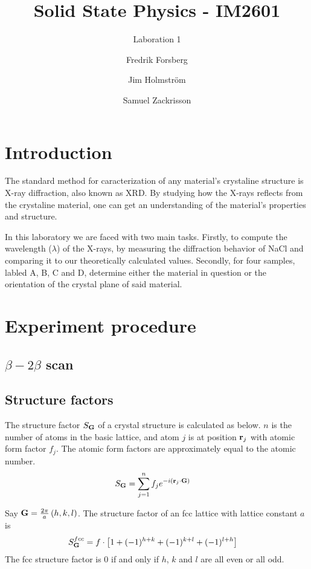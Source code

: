 \documentclass[a4paper,twoside=false,abstract=false,numbers=noenddot,
titlepage=false,headings=small,parskip=half,version=last]{scrartcl}
\title{Solid State Physics - IM2601}
\subtitle{Laboration 1}
\author[1]{Fredrik Forsberg}
\author[1]{Jim Holmström}
\author[1]{Samuel Zackrisson}
\affil[1]{Engineering Physics, Royal Institute of Technology}
\affil[1]{\{fforsber, jimho, samuelz\}@kth.se}
\begin{document}
\maketitle
\thispagestyle{empty}

\section{Introduction}
The standard method for caracterization of any material's crystaline structure is X-ray diffraction, also known as XRD. By studying how the X-rays reflects from the crystaline material, one can get an understanding of the material's properties and structure.

In this laboratory we are faced with two main tasks. Firstly, to compute the wavelength ($\lambda$) of the X-rays, by measuring the diffraction behavior of NaCl and comparing it to our theoretically calculated values. Secondly, for four samples, labled A, B, C and D, determine either the material in question or the orientation of the crystal plane of said material.

\section{Experiment procedure}
\subsection{$\beta-2\beta$ scan}

\subsection{Structure factors}
The structure factor $S_{\bold{G}}$ of a crystal structure is calculated as below. $n$ is the number of atoms in the basic lattice, and atom $j$ is at position $\bold{r}_j$ with atomic form factor $f_j$. The atomic form factors are approximately equal to the atomic number.\\
\begin{align}
S_{\bold{G}} &= \sum^n_{j=1} f_j e^{-i \left( \bold{r}_j \cdot \bold{G}\right)}
\end{align}

Say $\bold{G} = \frac{2\pi}{a}\left( h,k,l \right)$. The structure factor of an fcc lattice with lattice constant $a$ is 
\begin{align}
S^{fcc}_{\bold{G}} &= f\cdot \left[ 1 + (-1)^{h+k} + (-1)^{k+l} + (-1)^{l+h}\right]
\end{align}
The fcc structure factor is 0 if and only if $h$, $k$ and $l$ are all even or all odd.\\
\end{document}
